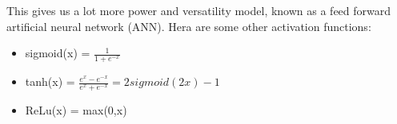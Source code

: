 This gives us a lot more power and versatility model, known as a feed forward artificial neural network (ANN). Hera are some other activation functions:

\begin{itemize}
	\item sigmoid(x) = $\frac{1} {1+e^{-x}} $
	\item tanh(x) = $\frac{e^{x}-e^{-x}} {e^{x}+e^{-x}} = 2 sigmoid(2x)-1$
	\item ReLu(x) = max(0,x)
\end{itemize}







